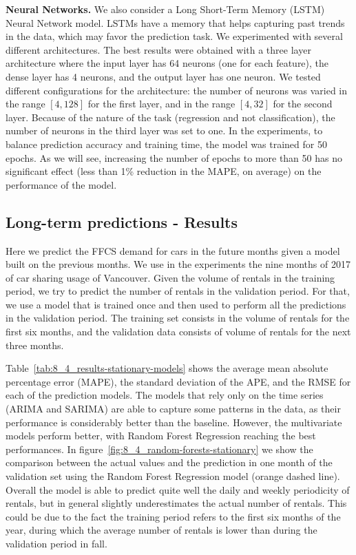 \textbf{Neural Networks.} We also consider a  Long Short-Term Memory (LSTM) Neural Network  model. LSTMs have a memory that helps capturing past trends in the data, which may favor the prediction task. We experimented with several different architectures. The best results were obtained with a three layer architecture where the input layer has 64 neurons (one for each feature), the dense layer has 4 neurons, and the output layer has one neuron. %
We tested different configurations for the architecture: the number of neurons was varied in the range $[4, 128]$ for the first layer, and in the range $[4, 32]$ for the second layer. Because of the nature of the task (regression and not classification), the number of neurons in the third layer was set to one.
In the experiments, to balance prediction accuracy and training time, the model was trained for 50 epochs. As we will see, increasing the number of epochs to more than 50 has no significant effect (less than 1\% reduction in the MAPE, on average) on the performance of the model.



\subsection{Long-term predictions -  Results}

Here we predict the FFCS demand for cars in the future months given a model built on the previous months. We use in the experiments the nine months of 2017 of car sharing usage of Vancouver. 
Given the volume of rentals in the training period, we try to predict the number of rentals in the validation period. For that, we use a  model that is trained once and then used to perform all the predictions in the validation period. 
The training set consists in the volume of rentals for the first six months, and the validation data consists of volume of rentals for the next three months.

Table~\ref{tab:8_4_results-stationary-models} shows the average mean absolute percentage error (MAPE), the standard deviation of the APE, and the RMSE for each of the prediction models.
The models that rely only on the time series (ARIMA and SARIMA) are able to capture some patterns in the data, as their performance is considerably better than the baseline. However, the multivariate models perform better, with Random Forest Regression reaching the best performances. In figure~\ref{fig:8_4_random-forests-stationary} we show the comparison between the actual values and the prediction in one month of the validation set using the Random Forest Regression model (orange dashed line). Overall the model is able to predict quite well the daily and weekly periodicity of rentals, but in general slightly underestimates the actual number of rentals. This could be due to the fact the training period refers to the first six months of the year, during which the average number of rentals is lower than during the validation period in fall.



